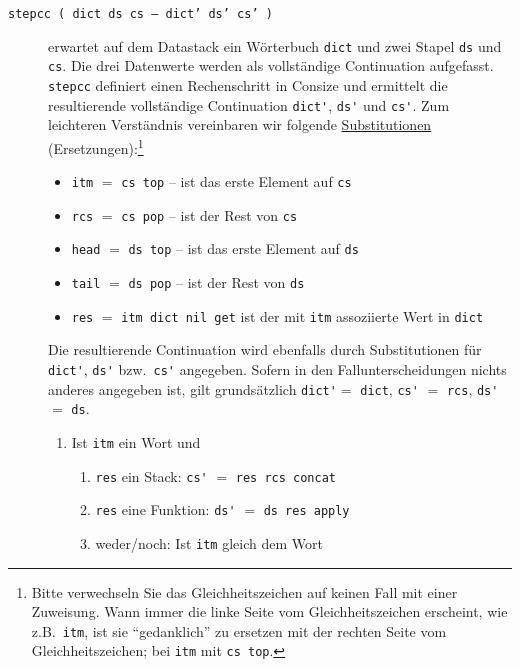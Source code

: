 \begin{description}\label{description.stepcc}
\item[\texttt{stepcc ( dict ds cs -- dict' ds' cs' )}] erwartet auf dem Datastack ein Wörterbuch \verb|dict| und zwei Stapel \verb|ds| und \verb|cs|. Die drei Datenwerte werden als voll\-stän\-di\-ge Continuation aufgefasst. \verb|stepcc| definiert einen Rechenschritt in Consize und ermittelt die resultierende vollständige Continuation \verb|dict'|, \verb|ds'| und \verb|cs'|. Zum leichteren Verständnis vereinbaren wir folgende \href{http://de.wikipedia.org/wiki/Substitution\_(Logik)}{Substitutionen} (Ersetzungen):\footnote{Bitte verwechseln Sie das Gleichheitszeichen auf keinen Fall mit einer Zuweisung. Wann immer die linke Seite vom Gleichheitszeichen erscheint, wie z.B.\ \texttt{itm}, ist sie "`gedanklich"' zu ersetzen mit der rechten Seite vom Gleichheitszeichen; bei \texttt{itm} mit \texttt{cs top}.}
\begin{itemize}
\item \verb|itm| $=$ \verb|cs top| -- ist das erste Element auf \verb|cs|
\item \verb|rcs| $=$ \verb|cs pop| -- ist der Rest von \verb|cs|
\item \verb|head| $=$ \verb|ds top| -- ist das erste Element auf \verb|ds|
\item \verb|tail| $=$ \verb|ds pop| -- ist der Rest von \verb|ds|
\item \verb|res| $=$ \verb|itm dict nil get| ist der mit \verb|itm| assoziierte Wert in \verb|dict|
\end{itemize}
Die resultierende Continuation wird ebenfalls durch Substitutionen für \verb|dict'|, \verb|ds'| bzw.\ \verb|cs'| angegeben. Sofern in den Fallunterscheidungen nichts anderes angegeben ist, gilt grundsätzlich \verb|dict'|$ =$ \verb|dict|, \verb|cs'| $=$ \verb|rcs|, \verb|ds'| $=$ \verb|ds|.
\begin{enumerate}
\item Ist \verb|itm| ein Wort und 
  \begin{enumerate}
  \item \verb|res| ein Stack:
    \verb|cs'| $=$ \verb|res rcs concat|
  \item \verb|res| eine Funktion:
    \verb|ds'| $=$ \verb|ds res apply|
  \item weder\slash noch:
    Ist \verb|itm| gleich dem Wort

\end{enumerate}
\end{enumerate}
\end{description}
